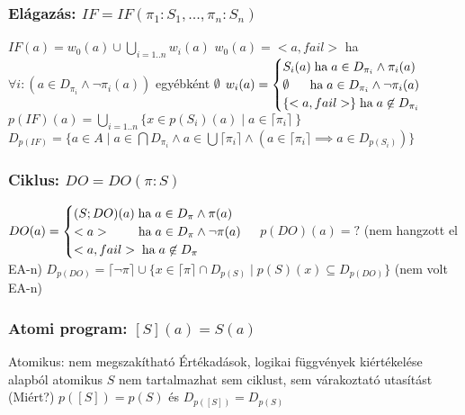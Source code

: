 \documentclass[12pt,a4paper]{article}
\begin{document}
\subsubsection{Elágazás: $IF=IF(\pi_1:S_1,...,\pi_n:S_n)$}

\begin{outline}
	\1 $IF(a) = w_0(a) \cup \bigcup_{i=1..n}w_i(a)$
		\2 $w_0(a)=<a,fail>$ ha $\forall i: (a \in D_{\pi_i} \wedge \lnot \pi_i(a))$
		egyébként $\emptyset$
		\2 $w_i(a) = \begin{cases}
		S_i(a) \text{\;ha\;} a \in D_{\pi_i} \wedge \pi_i(a)\\
		\emptyset \;\;\;\;\; \text{\;ha\;} a \in D_{\pi_i} \wedge \lnot \pi_i(a)\\
		\{<a,fail>\} \text{\;ha\;} a \not\in D_{\pi_i}\\
		\end{cases}$
	\1 $p(IF)(a)=\bigcup_{i=1..n}\{ x \in p(S_i)(a) \; | \; a \in \lceil \pi_i \rceil\ \}$
	\1 $D_{p(IF)}=\{a\in A \;|\; a \in \bigcap D_{\pi_i} \wedge a \in \bigcup\lceil \pi_i \rceil \wedge (a \in \lceil \pi_i \rceil \implies a \in D_{p(S_i)} )\}$
\end{outline}

\subsubsection{Ciklus: $DO=DO(\pi:S)$}

\begin{outline}
	\1 $DO(a)=\begin{cases}
	(S;DO)(a) \text{\;ha\;} a \in D_\pi \wedge \pi(a)\\
	<a> \;\;\;\;\;\;\; \text{\;ha\;} a \in D_\pi \wedge \lnot \pi(a)\\
	<a,fail> \text{\;ha\;} a \not \in D_\pi
	\end{cases}$
	\1 $p(DO)(a) = ?$ \;\; (nem hangzott el EA-n)
	\1 $D_{p(DO)} = \lceil \lnot \pi \rceil \cup \{ x \in \lceil \pi \rceil \cap D_{p(S)}
	\; | \; p(S)(x) \subseteq D_{p(DO)} \}$ (nem volt EA-n)
\end{outline}

\pagebreak

\subsubsection{Atomi program: $[S](a)=S(a)$}

\begin{outline}
	\1 Atomikus: nem megszakítható
		\2 Értékadások, logikai függvények kiértékelése alapból atomikus
	\1 $S$ nem tartalmazhat sem ciklust, sem várakoztató utasítást (Miért?)
	\1 $p([S])=p(S)$ és $D_{p([S])}=D_{p(S)}$
\end{outline}
\end{document}
